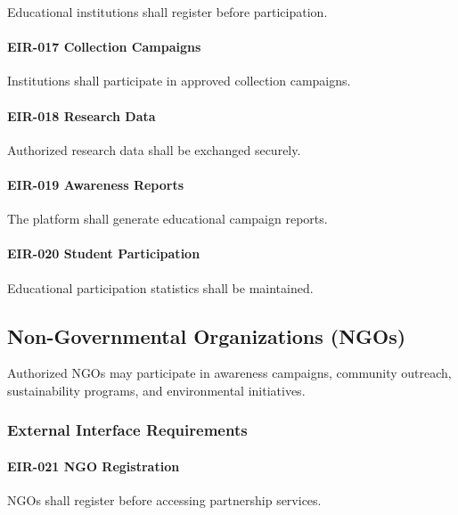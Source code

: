 Educational institutions shall register before participation.

\paragraph{EIR-017 Collection Campaigns}

Institutions shall participate in approved collection campaigns.

\paragraph{EIR-018 Research Data}

Authorized research data shall be exchanged securely.

\paragraph{EIR-019 Awareness Reports}

The platform shall generate educational campaign reports.

\paragraph{EIR-020 Student Participation}

Educational participation statistics shall be maintained.


\subsection{Non-Governmental Organizations (NGOs)}

Authorized NGOs may participate in awareness campaigns,
community outreach, sustainability programs, and environmental
initiatives.


\subsubsection*{External Interface Requirements}

\paragraph{EIR-021 NGO Registration}

NGOs shall register before accessing partnership services.

